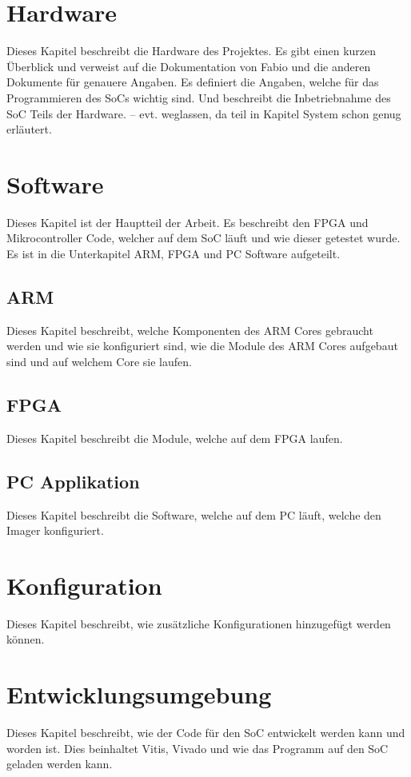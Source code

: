 \documentclass{article}
\begin{document}
\section{Hardware}
Dieses Kapitel beschreibt die Hardware des Projektes. Es gibt einen kurzen Überblick und verweist auf die Dokumentation von Fabio und die anderen Dokumente für genauere Angaben. Es definiert die Angaben, welche für das Programmieren des SoCs wichtig sind. Und beschreibt die Inbetriebnahme des SoC Teils der Hardware.
-- evt. weglassen, da teil in Kapitel System schon genug erläutert.

\section{Software}
Dieses Kapitel ist der Hauptteil der Arbeit. Es beschreibt den FPGA und Mikrocontroller Code, welcher auf dem SoC läuft und wie dieser getestet wurde. Es ist in die Unterkapitel ARM, FPGA und PC Software aufgeteilt.
\subsection{ARM}
Dieses Kapitel beschreibt, welche Komponenten des ARM Cores gebraucht werden und wie sie konfiguriert sind, wie die Module des ARM Cores aufgebaut sind und auf welchem Core sie laufen.
\subsection{FPGA}
Dieses Kapitel beschreibt die Module, welche auf dem FPGA laufen.
\subsection{PC Applikation}
Dieses Kapitel beschreibt die Software, welche auf dem PC läuft, welche den Imager konfiguriert.


\section{Konfiguration}
Dieses Kapitel beschreibt, wie zusätzliche Konfigurationen hinzugefügt werden können.

\section{Entwicklungsumgebung}
Dieses Kapitel beschreibt, wie der Code für den SoC entwickelt werden kann und worden ist. Dies beinhaltet Vitis, Vivado und wie das Programm auf den SoC geladen werden kann.
\end{document}
